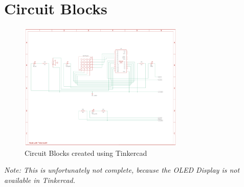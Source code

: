 \documentclass[10pt, oneside]{article}
\theoremstyle{remark}
\begin{document}
\section{Circuit Blocks}
\begin{figure}[H]
  \begin{center}
    \includegraphics[width=0.7\textwidth]{CircuitBlocks.png}
  \end{center}
  \caption{Circuit Blocks created using Tinkercad}
  \label{fig:circuit_blocks}
\end{figure}
\textit{Note: This is unfortunately not complete, because the OLED Display is not available in Tinkercad.}
\end{document}
